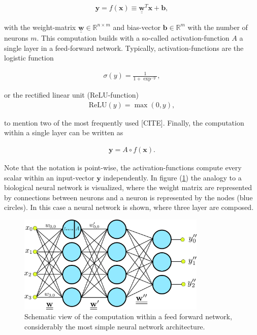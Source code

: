 \begin{align}
    \textbf{y}=f(\textbf{x})\equiv\underline{\underline{\textbf{w}}}^T\textbf{x}+\textbf{b},
\end{align}

with the weight-matrix $\underline{\underline{\textbf{w}}}\in\mathbb{R}^{n\times m}$ and bias-vector $\textbf{b}\in\mathbb{R}^{m}$ with the number of neurons $m$. This computation builds with a so-called activation-function $A$ a single layer in a feed-forward network. Typically, activation-functions are the logistic function 

\begin{align}
    \sigma(y)=\frac{1}{1+\exp^{-y}},
\end{align}

or the rectified linear unit (ReLU-function)
\begin{align}
    \text{ReLU}(y)=\max(0,y),
\end{align}

to mention two of the most frequently used [CITE]. Finally, the computation within a single layer can be written as

\begin{align}
    \textbf{y}=A\circ f(\textbf{x}).
\end{align}

Note that the notation is point-wise, the activation-functions compute every scalar within an input-vector $\textbf{y}$ independently. In figure (\ref{fig:nn_shematic}) the analogy to a biological neural network is visualized, where the weight matrix are represented by connections between neurons and a neuron is represented by the nodes (blue circles). In this case a neural network is shown, where three layer are composed.

\begin{figure}[ht]
    \center
    \includegraphics[width=0.8\textwidth]{figures/nn_shematic.png}
	\caption{Schematic view of the computation within a feed forward network, considerably the most simple neural network architecture.}
	\label{fig:nn_shematic}
\end{figure}

